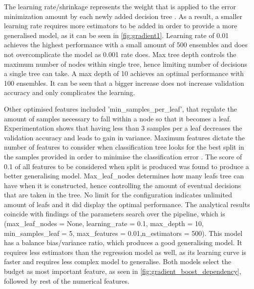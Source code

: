 The learning rate/shrinkage represents the weight that is applied to the error minimization amount by each newly added decision tree \cite{biasvariance}. As a result, a smaller learning rate requires more estimators to be added in order to provide a more generalised model, as it can be seen in \figurename{} \ref{fig:gradient1}. Learning rate of 0.01 achieves the highest performance with a small amount of 500 ensembles and does not overcomplicate the model as 0.001 rate does. Max tree depth controls the maximum number of nodes within single tree, hence limiting number of decisions a single tree can take. A max depth of 10 achieves an optimal performance with 100 ensembles. It can be seen that a bigger increase does not increase validation accuracy and only complicates the learning. 

Other optimised features included 'min\_samples\_per\_leaf', that regulate the amount of samples necessary to fall within a node so that it becomes a leaf. Experimentation shows that having less than 3 samples per a leaf decreases the validation accuracy and leads to gain in variance.  Maximum features dictate the number of features to consider when classification tree looks for the best split in the samples provided in order to minimise the classification error \cite{tan2006classification}. The score of 0.1 of all features to be considered when split is produced was found to produce a better generalising model. Max\_leaf\_nodes determines how many leafs tree can have when it is constructed, hence controlling the amount of eventual decisions that are taken in the tree. No limit for the configuration indicates unlimited amount of leafs and it did display the optimal performance.  The analytical results coincide with findings of the parameters search over the pipeline, which is (max\_leaf\_nodes = None, learning\_rate = 0.1, max\_depth =  10, min\_samples\_leaf = 5, max\_features = 0.01,n\_estimators = 500).­ This model has a balance bias/variance ratio, which produces a good generalising model. It requires less estimators than the regression model as well, as its learning curve is faster and requires less complex model to generalise. Both models select the budget as most important feature, as seen in \figurename{} \ref{fig:gradient_boost_dependency}, followed by rest of the numerical features.

